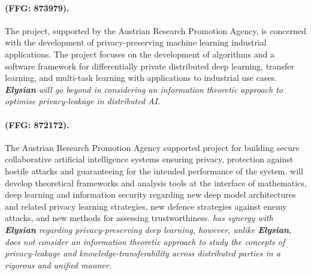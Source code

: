 \documentclass[a4paper,11pt]{article}
\newcommand{\project}[1]{\textbf{#1}\xspace}
\newcommand{\SECURITY}{\project{Elysian}}
\newcommand{\TheProject}{\SECURITY}
\begin{document}
\begin{mdframed}[backgroundcolor=blue!5]
\paragraph{\primal (FFG: 873979).}
The \primal project, supported by the Austrian Research Promotion Agency, is concerned with the development of privacy-preserving machine learning industrial applications. The project focuses on the development of algorithms and a software framework for differentially private distributed deep learning, transfer learning, and multi-task learning with applications to industrial use cases. \emph{\TheProject{} will go beyond \primal in considering an information theoretic approach to optimise privacy-leakage in distributed AI.}
 \end{mdframed}

\begin{mdframed}[backgroundcolor=blue!5]
\paragraph{\sthreeai (FFG: 872172).} The Austrian Research Promotion Agency supported \sthreeai project for building secure collaborative artificial intelligence systems ensuring privacy, protection against hostile attacks and guaranteeing for the intended performance of the system. \sthreeai will develop theoretical frameworks and analysis tools at the interface of mathematics, deep learning and information security regarding new deep model architectures and related privacy learning strategies, new defence strategies against enemy attacks, and new methods for assessing trustworthiness. \emph{\sthreeai has synergy with \TheProject{} regarding privacy-preserving deep learning, however, unlike \TheProject{}, \sthreeai does not consider an information theoretic approach to study the concepts of privacy-leakage and knowledge-transferability across distributed parties in a rigorous and unified manner}.    
\end{mdframed}
\end{document}
